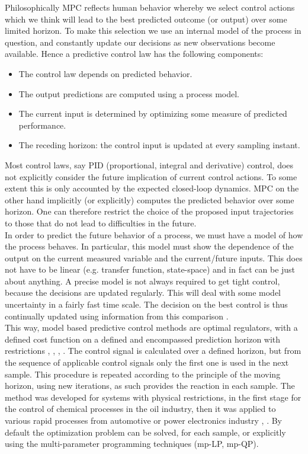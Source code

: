 Philosophically MPC reflects human behavior whereby we select control actions which we think will lead to the best predicted outcome (or output) over some limited horizon. To make this selection we use an internal model of the process in question, and constantly update our decisions as new observations become available. Hence a predictive control law has the following components:
\begin{itemize}
\item The control law depends on predicted behavior.
\item The output predictions are computed using a process model.
\item The current input is determined by optimizing some measure of predicted performance.
\item The receding horizon: the control input is updated at every sampling instant.
\end{itemize}

Most control laws, say PID (proportional, integral and derivative) control, does not explicitly consider the future implication of current control actions. To some extent this is only accounted by the expected closed-loop dynamics. MPC on the other hand
implicitly (or explicitly) computes the predicted behavior over some horizon. One can therefore restrict the choice of the proposed input trajectories to those that do not lead to difficulties in the future.\\
In order to predict the future behavior of a process, we must have a model of how the process behaves. In particular, this model must show the dependence of the output on the current measured variable and the current/future inputs. This does not have to be linear (e.g. transfer function, state-space) and in fact can be just about anything. A precise model is not always required to get tight control, because the decisions are updated regularly. This will deal with some model uncertainty in a fairly fast time scale. The decision on the best control is thus continually updated using information from this comparison \cite{rossiter2017model}.\\
This way, model based predictive control methods are optimal regulators, with a defined cost function on a defined and encompassed prediction horizon with restrictions \cite{kwon2006receding}, \cite{baotic2005optimal}, \cite{herceg2009real}, \cite{grancharova2005survey}. The control signal is calculated over a defined horizon, but from the sequence of applicable control signals only the first one is used in the next sample. This procedure is repeated according to the principle of the moving horizon, using new iterations, as such provides the reaction in each sample. The method was developed for systems with physical restrictions, in the first stage for the control of chemical processes in the oil industry, then it was applied to various rapid processes from automotive or power electronics industry \cite{antoniewicz2009predictive} , \cite{geyer2005low}. By default the optimization problem can be solved, for each sample, or explicitly using the multi-parameter programming techniques (mp-LP, mp-QP).%

